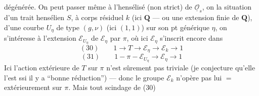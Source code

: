 dégénérée. On peut passer même à l'hensélisé (non strict) de $\underline{\mathcal O}_s$, on  la situation d'un trait hensélien $S$, à corps résiduel $k$ (ici $\mathbf Q$ --- ou une extension finie de $\mathbf Q$), d'une courbe $U_\eta$ de type $(g,\nu)$ (ici $(1,1)$) sur son pt générique $\eta$, on s'intéresse à l'extension $\mathcal E_{U_\eta}$ de $\mathcal E_\eta$ par $\pi$, où ici $\mathcal E_\eta$ s'inscrit encore dans
\[
(30)\qquad 1\longrightarrow T\longrightarrow\mathcal E_\eta\longrightarrow\mathcal E_k\longrightarrow1
\]
 
\[
(31)\qquad 1-\pi-\mathcal E_{U_\eta}\longrightarrow\mathcal E_\eta\longrightarrow1
\]
Ici l'action extérieure de $T$ sur $\pi$ n'est sûrement pas triviale (je conjecture qu'elle l'est ssi il y a ``bonne réduction'') --- donc le groupe $\mathcal E_k$ n'opère pas lui $=$ extérieurement sur $\pi$. Mais tout scindage de (30)
